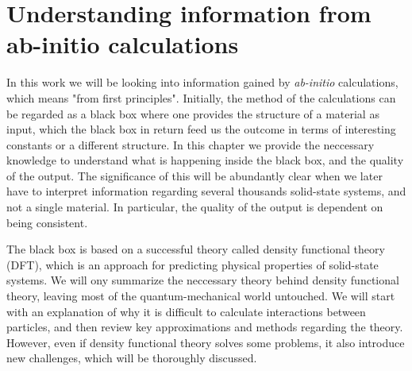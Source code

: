 \chapter{Understanding information from ab-initio calculations}

In this work we will be looking into information gained by \textit{ab-initio} calculations, which means "from first principles". Initially, the method of the calculations can be regarded as a black box where one provides the structure of a material as input, which the black box in return feed us the outcome in terms of interesting constants or a different structure. In this chapter we provide the neccessary knowledge to understand what is happening inside the black box, and the quality of the output. The significance of this will be abundantly clear when we later have to interpret information regarding several thousands solid-state systems, and not a single material. In particular, the quality of the output is dependent on being consistent.

The black box is based on a successful theory called density functional theory (DFT), which is an approach for predicting physical properties of solid-state systems. We will ony summarize the neccessary theory behind density functional theory, leaving most of the quantum-mechanical world untouched. We will start with an explanation of why it is difficult to calculate interactions between particles, and then review key approximations and methods regarding the theory. However, even if density functional theory solves some problems, it also introduce new challenges, which will be thoroughly discussed.



